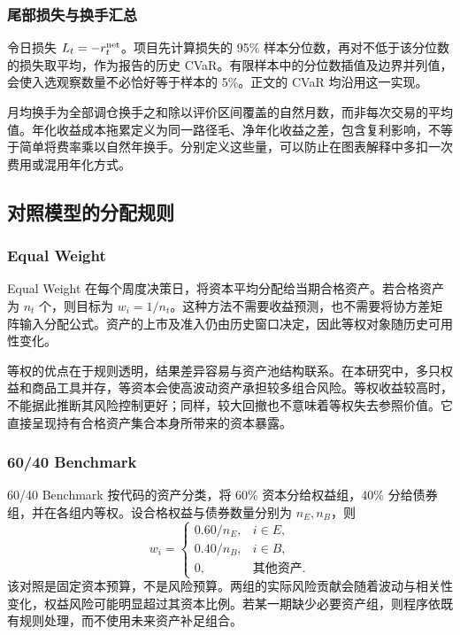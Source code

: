 \subsubsection{尾部损失与换手汇总}
令日损失 $L_t=-r_t^{\rm net}$。项目先计算损失的 95\% 样本分位数，再对不低于该分位数的损失取平均，作为报告的历史 CVaR。有限样本中的分位数插值及边界并列值，会使入选观察数量不必恰好等于样本的 5\%。正文的 CVaR 均沿用这一实现。

月均换手为全部调仓换手之和除以评价区间覆盖的自然月数，而非每次交易的平均值。年化收益成本拖累定义为同一路径毛、净年化收益之差，包含复利影响，不等于简单将费率乘以自然年换手。分别定义这些量，可以防止在图表解释中多扣一次费用或混用年化方式。


\subsection{对照模型的分配规则}
\label{app:benchmarks}
\subsubsection{Equal Weight}
Equal Weight 在每个周度决策日，将资本平均分配给当期合格资产。若合格资产为 $n_t$ 个，则目标为 $w_i=1/n_t$。这种方法不需要收益预测，也不需要将协方差矩阵输入分配公式。资产的上市及准入仍由历史窗口决定，因此等权对象随历史可用性变化。

等权的优点在于规则透明，结果差异容易与资产池结构联系。在本研究中，多只权益和商品工具并存，等资本会使高波动资产承担较多组合风险。等权收益较高时，不能据此推断其风险控制更好；同样，较大回撤也不意味着等权失去参照价值。它直接呈现持有合格资产集合本身所带来的资本暴露。

\subsubsection{60/40 Benchmark}
60/40 Benchmark 按代码的资产分类，将 60\% 资本分给权益组，40\% 分给债券组，并在各组内等权。设合格权益与债券数量分别为 $n_E,n_B$，则
\[
w_i=\begin{cases}
0.60/n_E,&i\in E,\\
0.40/n_B,&i\in B,\\
0,&\text{其他资产}.
\end{cases}
\]
该对照是固定资本预算，不是风险预算。两组的实际风险贡献会随着波动与相关性变化，权益风险可能明显超过其资本比例。若某一期缺少必要资产组，则程序依既有规则处理，而不使用未来资产补足组合。
